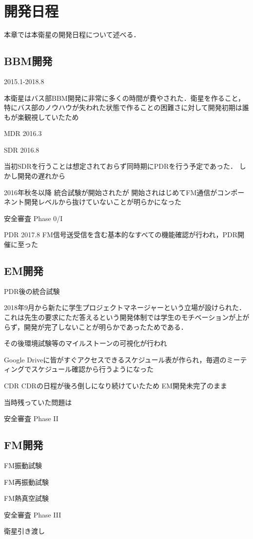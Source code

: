\section{開発日程}

本章では本衛星の開発日程について述べる．



\subsection{BBM開発}

2015.1-2018.8

本衛星はバス部BBM開発に非常に多くの時間が費やされた．衛星を作ること，特にバス部のノウハウが失われた状態で作ることの困難さに対して開発初期は誰もが楽観視していたため


MDR 2016.3



SDR 2016.8

当初SDRを行うことは想定されておらず同時期にPDRを行う予定であった．
しかし開発の遅れから


2016年秋冬以降
統合試験が開始されたが
開始されはじめてFM通信がコンポーネント開発レベルから抜けていないことが明らかになった

安全審査 Phase 0/I




PDR 2017.8
FM信号送受信を含む基本的なすべての機能確認が行われ，PDR開催に至った



\subsection{EM開発}

PDR後の統合試験


2018年9月から新たに学生プロジェクトマネージャーという立場が設けられた．これは先生の要求にただ答えるという開発体制では学生のモチベーションが上がらず，開発が完了しないことが明らかであったためである．

その後環境試験等のマイルストーンの可視化が行われ

Google Driveに皆がすぐアクセスできるスケジュール表が作られ，毎週のミーティングでスケジュール確認から行うようになった


CDR
CDRの日程が後ろ倒しになり続けていたため
EM開発未完了のまま

当時残っていた問題は


安全審査 Phase II

\subsection{FM開発}

FM振動試験

FM再振動試験

FM熱真空試験

安全審査 Phase III

衛星引き渡し